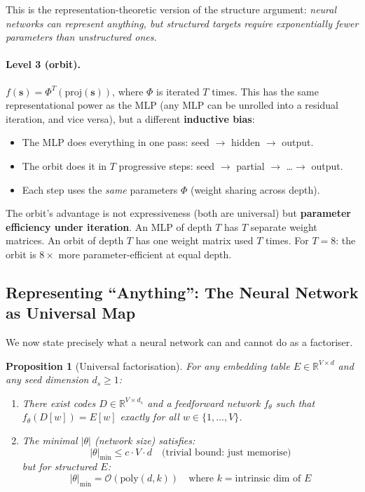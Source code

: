 \documentclass[11pt, a4paper]{article}
\newcommand{\R}{\mathbb{R}}
\newcommand{\calO}{\mathcal{O}}
\newtheorem{proposition}{Proposition}
\theoremstyle{remark}
\begin{document}
This is the representation-theoretic version of the structure argument:
\emph{neural networks can represent anything, but structured targets require exponentially
fewer parameters than unstructured ones.}

\paragraph{Level 3 (orbit).}
$f(\mathbf{s}) = \Phi^T(\text{proj}(\mathbf{s}))$, where $\Phi$ is iterated $T$ times.
This has the same representational power as the MLP (any MLP can be unrolled into a residual
iteration, and vice versa), but a different \textbf{inductive bias}:

\begin{itemize}[nosep]
    \item The MLP does everything in one pass: seed $\to$ hidden $\to$ output.
    \item The orbit does it in $T$ progressive steps: seed $\to$ partial $\to$ \ldots $\to$ output.
    \item Each step uses the \emph{same} parameters $\Phi$ (weight sharing across depth).
\end{itemize}

The orbit's advantage is not expressiveness (both are universal) but
\textbf{parameter efficiency under iteration}.
An MLP of depth $T$ has $T$ separate weight matrices.
An orbit of depth $T$ has one weight matrix used $T$ times.
For $T = 8$: the orbit is $8\times$ more parameter-efficient at equal depth.


\subsection{Representing ``Anything'': The Neural Network as Universal Map}

We now state precisely what a neural network can and cannot do as a factoriser.

\begin{proposition}[Universal factorisation]\label{prop:universal-fact}
For any embedding table $E \in \R^{V \times d}$ and any seed dimension $d_s \geq 1$:
\begin{enumerate}[nosep]
    \item There exist codes $D \in \R^{V \times d_s}$ and a feedforward network $f_\theta$
          such that $f_\theta(D[w]) = E[w]$ exactly for all $w \in \{1, \ldots, V\}$.
    \item The minimal $|\theta|$ (network size) satisfies:
    \[
        |\theta|_{\min} \leq c \cdot V \cdot d \quad \text{(trivial bound: just memorise)}
    \]
    but for structured $E$:
    \[
        |\theta|_{\min} = \calO(\text{poly}(d, k)) \quad \text{where } k = \text{intrinsic dim of } E
    \]
\end{enumerate}
\end{proposition}
\end{document}
